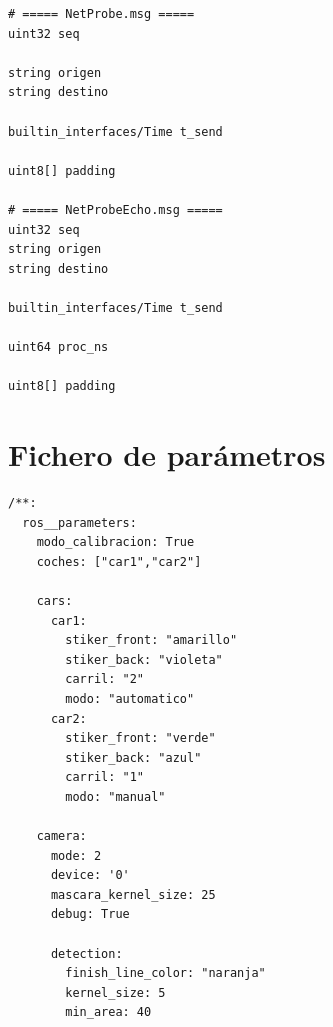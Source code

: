 \begin{lstlisting}[style=codigo, language=rosmsg, caption={Definición de los mensajes para medir la latencia de la red}, label={lst:msgs-red}]
# ===== NetProbe.msg =====
uint32 seq

string origen
string destino

builtin_interfaces/Time t_send

uint8[] padding

# ===== NetProbeEcho.msg =====
uint32 seq
string origen
string destino

builtin_interfaces/Time t_send

uint64 proc_ns

uint8[] padding
\end{lstlisting}

\section{Fichero de parámetros}
\label{sec:anexo-params}

\begin{lstlisting}[style=codigo, language=yamlsimple, caption={[Fichero de parámetros, la parte de los coches y de las cámaras]Fichero de parámetros, la parte de los coches y de las cámaras (\texttt{config/params.yaml})}, label={lst:params-yaml}]
/**:
  ros__parameters:
    modo_calibracion: True
    coches: ["car1","car2"]

    cars:
      car1:
        stiker_front: "amarillo"
        stiker_back: "violeta"
        carril: "2"
        modo: "automatico"
      car2:
        stiker_front: "verde"
        stiker_back: "azul"
        carril: "1"
        modo: "manual"

    camera:
      mode: 2
      device: '0'
      mascara_kernel_size: 25
      debug: True

      detection:
        finish_line_color: "naranja"
        kernel_size: 5
        min_area: 40
\end{lstlisting}

